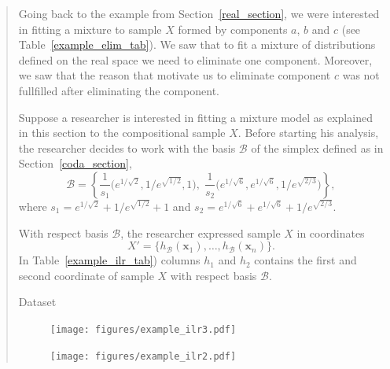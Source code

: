 \documentclass[10pt, a4paper]{article}
\begin{document}
\begin{quote}

Going back to the example from Section~\ref{real_section}, we were interested in fitting a mixture to sample $X$ formed by components $a$, $b$ and $c$ (see Table~\ref{example_elim_tab}). We saw that to fit a mixture of distributions defined on the real space we need to eliminate one component. Moreover, we saw that the reason that motivate us to eliminate component $c$ was not fullfilled after eliminating the component.

Suppose a researcher is interested in fitting a mixture model  as explained in this section to the compositional sample $X$. Before starting his analysis, the researcher decides to work with the basis $\mathcal{B}$ of the simplex defined as in Section~\ref{coda_section},
\begin{equation}
\mathcal{B} = \left\{ \frac{1}{s_1}\Big( e^{1/\sqrt{2}}, 1/e^{\sqrt{1/2}}, 1 \Big), \; \frac{1}{s_2}\Big( e^{1/\sqrt{6}}, e^{1/\sqrt{6}}, 1/e^{\sqrt{2/3}} \Big) \right\},
\end{equation}
where $s_1 = e^{1/\sqrt{2}} + 1/e^{\sqrt{ 1/2}} + 1$ and $s_2= e^{1/\sqrt{6}} + e^{1/\sqrt{6}} + 1/e^{\sqrt{2/3}}$. 

With respect basis $\mathcal{B}$, the researcher expressed sample $X$ in coordinates 
\[X' = \{h_{\mathcal{B}}(\textbf{x}_1), \dots, h_{\mathcal{B}}(\textbf{x}_n)\}.\] In Table~\ref{example_ilr_tab}) columns $h_1$ and $h_2$ contains the first and second coordinate of sample $X$ with respect basis $\mathcal{B}$.

\begin{table}
\centering
\scriptsize

\label{example_ilr_tab}
\caption{Dataset}
\end{table}


\begin{figure}[thbp]
\centering
\texttt{[image: figures/example\_ilr3.pdf]}
\caption{}\label{example_ilr3}
\end{figure}


\begin{figure}[thbp]
\centering
\texttt{[image: figures/example\_ilr2.pdf]}
\caption{}\label{example_ilr2}
\end{figure}
% 

\end{quote}
\end{document}
